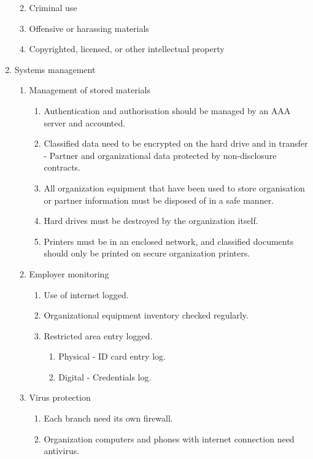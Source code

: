 \begin{enumerate}
\begin{enumerate}
\begin{enumerate}
\begin{enumerate}
      \end{enumerate}
    \end{enumerate}
    \item Criminal use
    \item Offensive or harassing materials
    \item Copyrighted, licensed, or other intellectual property
  \end{enumerate}
  \item Systems management
  \begin{enumerate}
    \item Management of stored materials
    \begin{enumerate}
      \item Authentication and authorisation should be managed by an AAA server and accounted.
      \item Classified data need to be encrypted on the hard drive and in transfer - Partner and organizational data protected by non-disclosure contracts.
      \item All organization equipment that have been used to store organisation or partner information must be disposed of in a safe manner.
      \item Hard drives must be destroyed by the organization itself.
      \item Printers must be in an enclosed network, and classified documents should only be printed on secure organization printers.
    \end{enumerate}
    \item Employer monitoring
    \begin{enumerate}
      \item Use of internet logged.
      \item Organizational equipment inventory checked regularly.
      \item Restricted area entry logged.
      \begin{enumerate}
        \item Physical - ID card entry log.
        \item Digital - Credentials log.
      \end{enumerate}
    \end{enumerate}
    \item Virus protection
    \begin{enumerate}
      \item Each branch need its own firewall.
      \item Organization computers and phones with internet connection need antivirus.

\end{enumerate}
\end{enumerate}
\end{enumerate}
